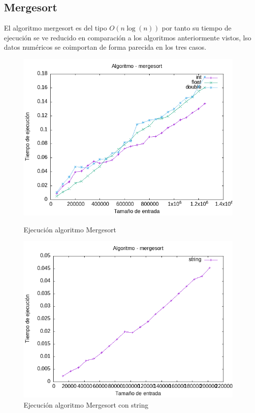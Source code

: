\documentclass[11pt]{article}
\begin{document}
\subsection*{Mergesort}
El algoritmo mergesort es del tipo $O(n\log(n))$ por tanto su tiempo de ejecución se ve reducido en comparación a los algoritmos 
anteriormente vistos, lso datos numéricos se coimportan de forma parecida en los tres casos.
\begin{figure}[H]
    \begin{minipage}{0.5\textwidth}
        \centering
        \includegraphics[width=\linewidth]{assets/Img/mergesort.png}
        \caption{Ejecución algoritmo Mergesort}
        \label{fig:mergesort}
    \end{minipage}%
    \begin{minipage}{0.5\textwidth}
        \centering
        \includegraphics[width=\linewidth]{assets/Img/mergesortstring.png}
        \caption{Ejecución algoritmo Mergesort con string}
        \label{fig:mergesortstring}
    \end{minipage}
\end{figure}
\end{document}
